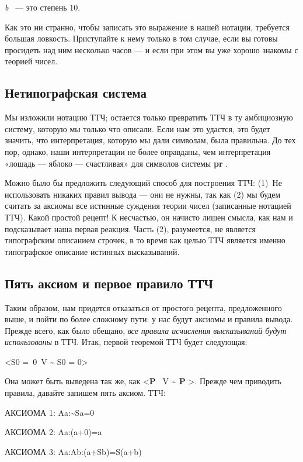 \documentclass[../main.tex]{subfiles}
\begin{document}
\emph{b} ~--- это степень 10.

Как это ни странно, чтобы записать это выражение в нашей нотации, требуется большая ловкость. Приступайте к нему только в том случае, если вы готовы просидеть над ним несколько часов --- и если при этом вы уже хорошо знакомы с теорией чисел.


\subsection{Нетипографская система}

Мы изложили нотацию ТТЧ; остается только превратить ТТЧ в ту амбициозную систему, которую мы только что описали. Если нам это удастся, это будет значить, что интерпретация, которую мы дали символам, была правильна. До тех пор, однако, наши интерпретации не более оправданы, чем интерпретация «лошадь --- яблоко --- счастливая» для символов системы \textbf{pr} .

Можно было бы предложить следующий способ для построения ТТЧ: (1)~Не использовать никаких правил вывода --- они не нужны, так как (2) мы будем считать за аксиомы все истинные суждения теории чисел (записанные нотацией ТТЧ). Какой простой рецепт! К несчастью, он начисто лишен смысла, как нам и подсказывает наша первая реакция. Часть (2), разумеется, не является типографским описанием строчек, в то время как целью ТТЧ является именно типографское описание истинных высказываний.


\subsection{Пять аксиом и первое правило ТТЧ}

Таким образом, нам придется отказаться от простого рецепта, предложенного выше, и пойти по более сложному пути: у нас будут аксиомы и правила вывода. Прежде всего, как было обещано, \emph{все правила исчисления высказываний будут использованы} в ТТЧ. Итак, первой теоремой ТТЧ будет следующая:

\textless S0 =~0~V \textasciitilde{} S0 = 0\textgreater{}

Она может быть выведена так же, как \textless{}\textbf{P} ~V \textbf{\textasciitilde{} P} \textgreater. Прежде чем приводить правила, давайте запишем пять аксиом. ТТЧ:

АКСИОМА 1: Aa:\textasciitilde Sa=0

АКСИОМА 2: Aa:(a+0)=a

АКСИОМА 3: Aa:Ab:(a+Sb)=S(a+b)
\end{document}
